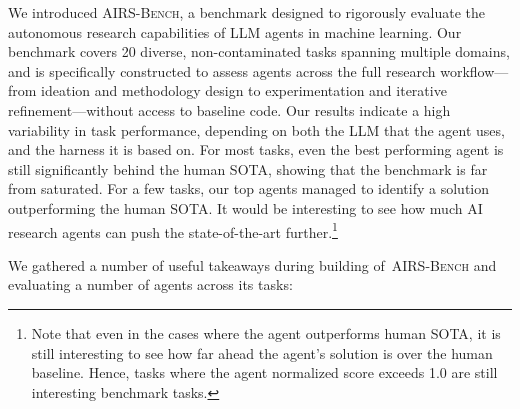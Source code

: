 \documentclass{fairmeta}
\newcommand{\airsbench}{\textsc{AIRS-Bench}}
\begin{document}
We introduced \airsbench, a benchmark designed to rigorously evaluate the autonomous research capabilities of LLM agents in machine learning. Our benchmark covers 20 diverse, non-contaminated tasks spanning multiple domains, and is specifically constructed to assess agents across the full research workflow---from ideation and methodology design to experimentation and iterative refinement---without access to baseline code.
Our results indicate a high variability in task performance, depending on both the LLM that the agent uses, and the harness it is based on. For most tasks, even the best performing agent is still significantly behind the human SOTA, showing that the benchmark is far from saturated. For a few tasks, our top agents managed to identify a solution outperforming the human SOTA. It would be interesting to see how much AI research agents can push the state-of-the-art further.\footnote{Note that even in the cases where the agent outperforms human SOTA, it is still interesting to see how far ahead the agent's solution is over the human baseline. Hence, tasks where the agent normalized score exceeds 1.0 are still interesting benchmark tasks.}

We gathered a number of useful takeaways during building of~\airsbench{} and evaluating a number of agents across its tasks:
\end{document}
